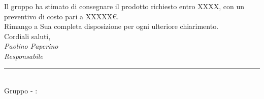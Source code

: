 \begin{titlepage}
\begin{large}
	Il gruppo \GroupName{} ha stimato di consegnare il prodotto richiesto entro XXXX, con un preventivo di costo pari a XXXXX€.\\
	
	Rimango a Sua completa disposizione per ogni ulteriore chiarimento. \\
	
	Cordiali saluti,\\
	
	\emph{Paolino Paperino} \\
	\emph{Responsabile \GroupName{}}
	
	\end{large}
	
	\vspace{1cm} 
	\begin{center}
		\rule{13cm}{0,03cm} \\
		Gruppo \GroupName{} - \email: \GroupEmail{}
	\end{center} 
	
	
	\end{titlepage}
  
 \restoregeometry
